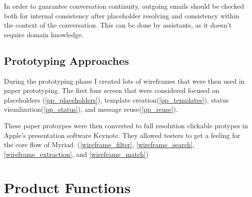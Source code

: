 In order to guarantee conversation continuity, outgoing emails should be checked both for internal consistency after placeholder resolving and consistency within the context of the conversation. This can be done by assistants, as it doesn’t require domain knowledge.

\subsection{Prototyping Approaches}

During the prototyping phase I created lots of wireframes that were then used in paper prototyping.
The first four screen that were considered focused on placeholders (\autoref{pp_placeholders}), template creation(\autoref{pp_templates}), status visualization(\autoref{pp_status}), and message reuse(\autoref{pp_reuse}).






These paper protoypes were then converted to full resolution clickable protypes in Apple's presentation software Keynote. They allowed testers to get a feeling for the core flow of Myriad. (\autoref{wireframe_filter}, \autoref{wireframe_search}, \autoref{wireframe_extraction}, and \autoref{wireframe_match})





\section{Product Functions}

